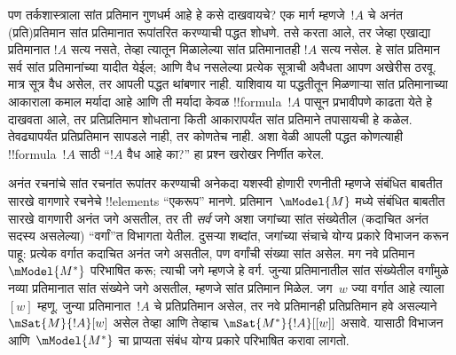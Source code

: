 \documentclass[../../../include/open-logic-section]{subfiles}
\begin{document}
पण तर्कशास्त्राला सांत प्रतिमान
गुणधर्म आहे हे कसे दाखवायचे?
एक मार्ग म्हणजे~$!A$ चे
अनंत (प्रति)प्रतिमान सांत
प्रतिमानात रूपांतरित करण्याची
पद्धत शोधणे. तसे करता आले,
तर जेव्हा एखाद्या प्रतिमानात
$!A$ सत्य नसते, तेव्हा
त्यातून मिळालेल्या सांत
प्रतिमानातही $!A$ सत्य
नसेल. हे सांत प्रतिमान
सर्व सांत प्रतिमानांच्या
यादीत येईल; आणि वैध
नसलेल्या प्रत्येक सूत्राची
अवैधता आपण अखेरीस ठरवू.
मात्र सूत्र वैध असेल, तर
आपली पद्धत थांबणार नाही.
याशिवाय या पद्धतीतून
मिळणाऱ्या सांत प्रतिमानाच्या
आकाराला कमाल मर्यादा आहे
आणि ती मर्यादा केवळ
!!{formula}~$!A$ पासून प्रभावीपणे काढता येते
हे दाखवता आले, तर
प्रतिप्रतिमान शोधताना
किती आकारापर्यंत सांत
प्रतिमाने तपासायची हे कळेल.
तेवढ्यापर्यंत प्रतिप्रतिमान
सापडले नाही, तर कोणतेच
नाही. अशा वेळी आपली
पद्धत कोणत्याही
!!{formula}~$!A$ साठी
“$!A$ वैध आहे का?” हा
प्रश्न खरोखर निर्णीत करेल.

अनंत रचनांचे सांत रचनांत
रूपांतर करण्याची अनेकदा
यशस्वी होणारी रणनीती म्हणजे
संबंधित बाबतीत सारखे
वागणारे रचनेचे !!{element}s
“एकरूप” मानणे. प्रतिमान~$\mModel{M}$
मध्ये संबंधित बाबतीत सारखे
वागणारी अनंत जगे असतील,
तर ती \emph{सर्व} जगे अशा
जगांच्या सांत संख्येतील
(कदाचित अनंत सदस्य असलेल्या)
“वर्गां”त विभागता येतील.
दुसऱ्या शब्दांत, जगांच्या
संचाचे योग्य प्रकारे विभाजन
करून पाहू: प्रत्येक वर्गात
कदाचित अनंत जगे असतील,
पण वर्गांची संख्या सांत असेल.
मग नवे प्रतिमान~$\mModel{M^*}$
परिभाषित करू; त्याची जगे
म्हणजे हे वर्ग. जुन्या
प्रतिमानातील सांत संख्येतील
वर्गांमुळे नव्या प्रतिमानात
सांत संख्येने जगे असतील,
म्हणजे सांत प्रतिमान मिळेल.
जग~$w$ ज्या वर्गात आहे
त्याला $[w]$ म्हणू.
जुन्या प्रतिमानात~$!A$ चे
प्रतिप्रतिमान असेल, तर नवे
प्रतिमानही प्रतिप्रतिमान
हवे असल्याने
$\mSat{M}{!A}[w]$ असेल
तेव्हा आणि तेव्हाच
$\mSat{M^*}{!A}[{[w]}]$
असावे. यासाठी विभाजन
आणि~$\mModel{M^*}$ चा
प्राप्यता संबंध योग्य
प्रकारे परिभाषित करावा लागतो.
\end{document}
